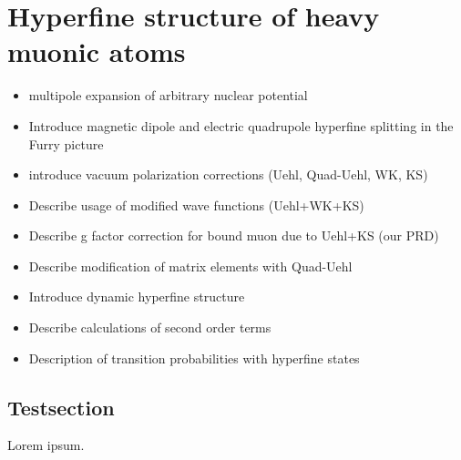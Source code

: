 \chapter{Hyperfine structure of heavy muonic atoms}
\label{ch:muonic_atoms}

\begin{itemize}
\item multipole expansion of arbitrary nuclear potential
\item Introduce magnetic dipole and electric quadrupole hyperfine splitting in the Furry picture
\item introduce vacuum polarization corrections (Uehl, Quad-Uehl, WK, KS)
\item Describe usage of modified wave functions (Uehl+WK+KS)
\item Describe g factor correction for bound muon due to Uehl+KS (our PRD)
\item Describe modification of matrix elements with Quad-Uehl
\item Introduce dynamic hyperfine structure
\item Describe calculations of second order terms
\item Description of transition probabilities with hyperfine states
\end{itemize} 
\newpage
\section{Testsection}
Lorem ipsum.







